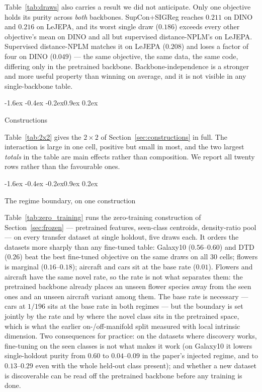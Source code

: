 \documentclass{article}
\makeatletter
\renewcommand\subsection{\@startsection{subsection}{2}{\z@}%
  {-1.6ex \@plus -0.4ex \@minus -0.2ex}{0.9ex \@plus 0.2ex}%
  {\normalsize\bf\raggedright}}
\makeatother
\begin{document}
Table~\ref{tab:draws} also carries a result we did not anticipate. Only one
objective holds its purity across \emph{both} backbones. SupCon+SIGReg reaches
$0.211$ on DINO and $0.216$ on LeJEPA, and its worst single draw ($0.186$)
exceeds every other objective's mean on DINO and all but supervised
distance-NPLM's on LeJEPA. Supervised distance-NPLM matches it
on LeJEPA ($0.208$) and loses a factor of four on DINO ($0.049$) --- the same
objective, the same data, the same code, differing only in the pretrained
backbone. Backbone-independence is a stronger and more useful property than winning on
average, and it is not visible in any single-backbone table.


\subsection{Constructions}


Table~\ref{tab:2x2} gives the $2\times2$ of Section~\ref{sec:constructions} in
full. The interaction is large in one cell, positive but small in most, and
the two largest \emph{totals} in the table are main effects rather than
composition. We report all twenty rows rather than the favourable ones.

\subsection{The regime boundary, on one construction}

Table~\ref{tab:zero_training} runs the zero-training construction of
Section~\ref{sec:frozen} --- pretrained features, seen-class centroids,
density-ratio pool --- on every transfer dataset at single holdout, five
draws each. It orders the datasets more sharply than any fine-tuned table:
Galaxy10 ($0.56$--$0.60$) and DTD ($0.26$) beat the best fine-tuned objective
on the same draws on all $30$ cells; flowers is marginal ($0.16$--$0.18$);
aircraft and cars sit at the base rate ($0.01$). Flowers
and aircraft have the same novel rate, so the rate is not what separates
them: the pretrained backbone already places an unseen flower species away from
the seen ones and an unseen aircraft variant among them. The base rate is
necessary --- cars at $1/196$ sits at the base rate in both regimes --- but the boundary is
set jointly by the rate and by where the novel class sits in the pretrained
space, which is what the earlier on-/off-manifold split measured with local
intrinsic dimension. Two consequences for practice: on the datasets where
discovery works, fine-tuning on the seen classes is not what makes it work
(on Galaxy10 it lowers single-holdout purity from $0.60$ to $0.04$--$0.09$
in the paper's injected regime, and to $0.13$--$0.29$ even with the whole
held-out class present); and whether a new dataset is discoverable can be
read off the pretrained backbone before any training is done.
\end{document}
